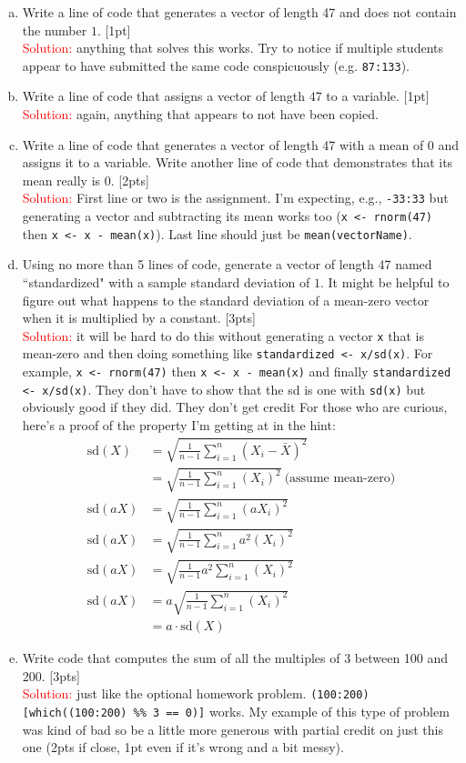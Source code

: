 \documentclass[12pt]{article}
\newcommand{\ans}{\\\textcolor{red}{Solution: }}
\begin{document}
\begin{enumerate}[(a)]
	\item Write a line of code that generates a vector of length 47 and does not contain the number $1$. [1pt] \ans anything that solves this works. Try to notice if multiple students appear to have submitted the same code conspicuously (e.g. \verb|87:133|).
	\item Write a line of code that assigns a vector of length 47 to a variable. [1pt] \ans{again, anything that appears to not have been copied.}
	\item Write a line of code that generates a vector of length 47 with a mean of $0$ and assigns it to a variable. Write another line of code that demonstrates that its mean really is $0$. [2pts] \ans First line or two is the assignment. I'm expecting, e.g., \verb|-33:33| but generating a vector and subtracting its mean works too (\verb|x <- rnorm(47)| then \verb|x <- x - mean(x)|). Last line should just be \verb|mean(vectorName)|.
	\item Using no more than 5 lines of code, generate a vector of length 47 named ``standardized" with a sample standard deviation of $1$. It might be helpful to figure out what happens to the standard deviation of a mean-zero vector when it is multiplied by a constant. [3pts] \ans it will be hard to do this without generating a vector \verb|x| that is mean-zero and then doing something like \verb|standardized <- x/sd(x)|. For example, \verb|x <- rnorm(47)| then \verb|x <- x - mean(x)| and finally \verb|standardized <- x/sd(x)|. They don't have to show that the sd is one with \verb|sd(x)| but obviously good if they did. They don't get credit  For those who are curious, here's a proof of the property I'm getting at in the hint:
	\begin{align*}
	\text{sd}(X) &= \sqrt{\frac{1}{n-1}\sum_{i=1}^n (X_i - \bar{X})^2} \\
	&= \sqrt{\frac{1}{n-1}\sum_{i=1}^n (X_i)^2}~\text{(assume mean-zero)} \\
	\text{sd}(aX) &= \sqrt{\frac{1}{n-1}\sum_{i=1}^n (aX_i)^2} \\
	\text{sd}(aX) &= \sqrt{\frac{1}{n-1}\sum_{i=1}^n a^2(X_i)^2} \\
	\text{sd}(aX) &= \sqrt{\frac{1}{n-1}a^2\sum_{i=1}^n (X_i)^2} \\
	\text{sd}(aX) &= a\sqrt{\frac{1}{n-1}\sum_{i=1}^n (X_i)^2} \\
	&=a \cdot \text{sd}(X)
	\end{align*}
	\item Write code that computes the sum of all the multiples of $3$ between 100 and 200. [3pts] \ans just like the optional homework problem. \verb|(100:200)[which((100:200) %% 3 == 0)]| works. My example of this type of problem was kind of bad so be a little more generous with partial credit on just this one (2pts if close, 1pt even if it's wrong and a bit messy).
\end{enumerate}
\end{document}
